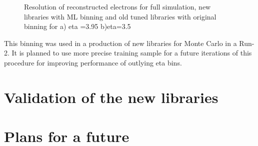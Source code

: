\begin{figure}[!tbp]
\begin{minipage}[h]{0.49\linewidth}
\end{minipage}
\hfill
\begin{minipage}[h]{0.49\linewidth}
\end{minipage}
\caption{Resolution of reconstructed electrons for full simulation, new libraries with ML binning and old tuned libraries with original binning for a) eta =3.95 b)eta=3.5 }
\label{fig:Class}
\end{figure}

This binning was used in a production of new libraries for Monte Carlo in a Run-2. It is planned to use more precise training sample for a future iterations of this procedure for improving performance of outlying eta bins.

\section{Validation of the new libraries}
\section{Plans for a future}